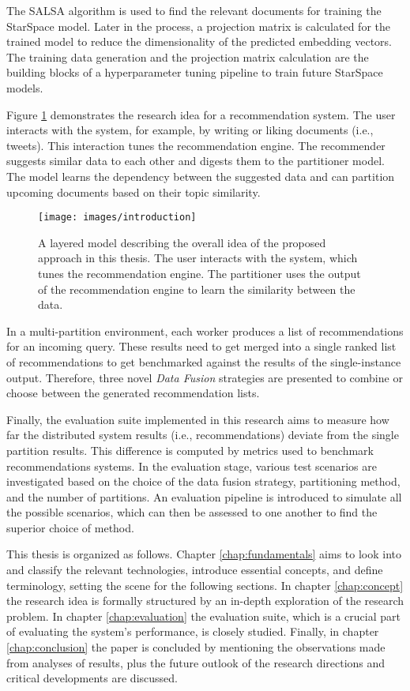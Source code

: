 The SALSA algorithm is used to find the relevant documents for training the StarSpace model. Later in the process, a projection matrix is calculated for the trained model to reduce the dimensionality of the predicted embedding vectors. The training data generation and the projection matrix calculation are the building blocks of a hyperparameter tuning pipeline to train future StarSpace models.


Figure \ref{fig:introduction} demonstrates the research idea for a recommendation system. The user interacts with the system, for example, by writing or liking documents (i.e., tweets). This interaction tunes the recommendation engine. The recommender suggests similar data to each other and digests them to the partitioner model. The model learns the dependency between the suggested data and can partition upcoming documents based on their topic similarity.


\begin{figure}[!htb]
    \centering
    \texttt{[image: images/introduction]}
    \caption{A layered model describing the overall idea of the proposed approach in this thesis. The user interacts with the system, which tunes the recommendation engine. The partitioner uses the output of the recommendation engine to learn the similarity between the data.}
    \label{fig:introduction}
\end{figure}


In a multi-partition environment, each worker produces a list of recommendations for an incoming query. These results need to get merged into a single ranked list of recommendations to get benchmarked against the results of the single-instance output. Therefore, three novel \emph{Data Fusion} strategies are presented to combine or choose between the generated recommendation lists.


Finally, the evaluation suite implemented in this research aims to measure how far the distributed system results (i.e., recommendations) deviate from the single partition results. This difference is computed by metrics used to benchmark recommendations systems. In the evaluation stage, various test scenarios are investigated based on the choice of the data fusion strategy, partitioning method, and the number of partitions. An evaluation pipeline is introduced to simulate all the possible scenarios, which can then be assessed to one another to find the superior choice of method.


This thesis is organized as follows. Chapter \ref{chap:fundamentals} aims to look into and classify the relevant technologies, introduce essential concepts, and define terminology, setting the scene for the following sections. In chapter \ref{chap:concept} the research idea is formally structured by an in-depth exploration of the research problem. In chapter \ref{chap:evaluation} the evaluation suite, which is a crucial part of evaluating the system's performance, is closely studied. Finally, in chapter \ref{chap:conclusion} the paper is concluded by mentioning the observations made from analyses of results, plus the future outlook of the research directions and critical developments are discussed.


